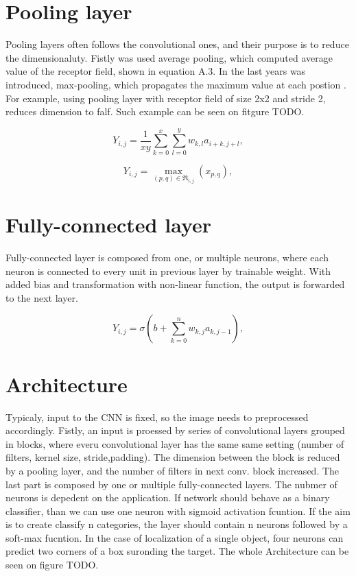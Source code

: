 \documentclass[twoside]{ctuthesis}
\theoremstyle{plain}
\theoremstyle{definition}
\theoremstyle{note}
\begin{document}
\section{Pooling layer}
Pooling layers often follows the convolutional ones, and their purpose is to reduce 
the dimensionaluty. Fistly was used average pooling, which computed average value of
the receptor field, shown in equation A.3. In the last years was introduced, max-pooling, 
which propagates the maximum value at each postion \cite{CNNREW}. For example, using pooling
layer with receptor field of size 2x2 and stride 2, reduces dimension to falf. Such example
can be seen on fitgure TODO.

\begin{equation} 
	Y_{i,j}=\frac{1}{xy}\sum_{k=0}^{x}\sum_{l=0}^{y}w_{k,l}a_{i+k,j+l},
\end{equation} 

\begin{equation} 
	Y_{i,j} = \max_{(p,q)\in{\Re_{i,j}}}(x_{p,q}),
\end{equation} 


\section{Fully-connected layer}
Fully-connected layer is composed from one, or multiple neurons, where each neuron is connected
to every unit in previous layer by trainable weight. With added bias and transformation with
non-linear function, the output is forwarded to the next layer.

\begin{equation} 
	Y_{i,j}=\sigma(b +\sum_{k=0}^{n}w_{k,j}a_{k,j-1}),
\end{equation}


\section{Architecture}
Typicaly, input to the CNN is fixed, so the image needs to preprocessed accordingly.
Fistly, an input is proessed by series of convolutional layers grouped in blocks, 
where everu convolutional layer has the same same setting (number of filters, kernel size, 
stride,padding). The dimension between the block is reduced by a pooling layer, and the number
of filters in next conv. block increased. The last part is composed by one or multiple
fully-connected layers. The nubmer of neurons is depedent on the application. If network
should behave as a binary classifier, than we can use one neuron with sigmoid 
activation fcuntion. If the aim is to create classify n categories, the layer should
contain n neurons followed by a soft-max fucntion. In the case of localization of a single
object, four neurons can predict two corners of a box suronding the target. The whole Architecture
can be seen on figure TODO.
\end{document}
